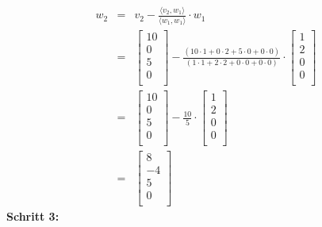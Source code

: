 \documentclass{article}
\begin{document}
			\begin{eqnarray*} w_2 &=& v_2 - \frac{\langle v_2, w_1 \rangle}{\langle w_1, w_1 \rangle} \cdot w_1 \\
				&=& \begin{bmatrix} 10 \\ 0 \\ 5 \\ 0 \\ \end{bmatrix} - \frac{(10 \cdot 1 + 0 \cdot 2 + 5 \cdot 0 + 0 \cdot 0)}
				{(1 \cdot 1 + 2 \cdot 2 + 0 \cdot 0 + 0 \cdot 0)} \cdot \begin{bmatrix} 1 \\ 2 \\ 0 \\ 0 \\ \end{bmatrix} \\
				&=& \begin{bmatrix} 10 \\ 0 \\ 5 \\ 0 \\ \end{bmatrix} - 
				\frac{10}{5} \cdot \begin{bmatrix} 1 \\ 2 \\ 0 \\ 0 \\ \end{bmatrix} \\
				&=& \begin{bmatrix} 8 \\ -4 \\ 5 \\ 0 \\ \end{bmatrix}
			\end{eqnarray*}
			\textbf{Schritt 3:}\\
\end{document}

